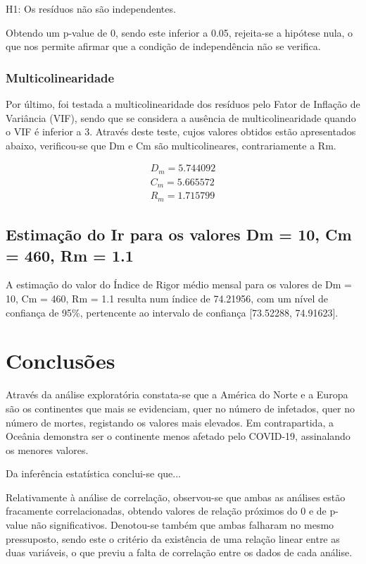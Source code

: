 \documentclass[conference]{IEEEtran}
\begin{document}
H1: Os resíduos não são independentes.

Obtendo um p-value de 0, sendo este inferior a 0.05, rejeita-se a hipótese nula, o que nos permite afirmar que a condição de independência não se verifica.

\subsubsection{Multicolinearidade} 
Por último, foi testada a multicolinearidade dos resíduos pelo Fator de Inflação de Variância (VIF), sendo que se considera a ausência de multicolinearidade quando o VIF é inferior a 3. Através deste teste, cujos valores obtidos estão apresentados abaixo, verificou-se que Dm e Cm são multicolineares, contrariamente a Rm.

\begin{equation}
\begin{array}{l}
	D_{m}=5.744092 \\
	C_{m}=5.665572 \\
	R_{m}=1.715799
\end{array}
\end{equation}


\subsection{Estimação do Ir para os valores Dm = 10, Cm = 460, Rm = 1.1}
A estimação do valor do Índice de Rigor médio mensal para os valores de Dm = 10, Cm = 460, Rm = 1.1 resulta num índice de 74.21956, com um nível de confiança de 95\%, pertencente ao intervalo de confiança [73.52288, 74.91623].


\section{Conclusões} %
Através da análise exploratória constata-se que a América do Norte e a Europa são os continentes que mais se evidenciam, quer no número de infetados, quer no número de mortes, registando os valores mais elevados. Em contrapartida, a Oceânia demonstra ser o continente menos afetado pelo COVID-19, assinalando os menores valores.

Da inferência estatística conclui-se que...

Relativamente à análise de correlação, observou-se que ambas as análises estão fracamente correlacionadas, obtendo valores de relação próximos do 0 e de p-value não significativos. Denotou-se também que ambas falharam no mesmo pressuposto, sendo este o critério da existência de uma relação linear entre as duas variáveis, o que previu a falta de correlação entre os dados de cada análise.
\end{document}
